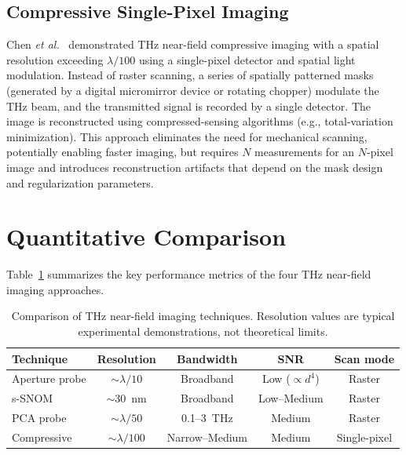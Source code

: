 \documentclass[reprint,superscriptaddress,amsmath,amssymb]{revtex4-2}
\begin{document}
\subsection{Compressive Single-Pixel Imaging}

Chen \textit{et al.}~\cite{Chen2019} demonstrated THz near-field compressive imaging with a spatial resolution exceeding $\lambda/100$ using a single-pixel detector and spatial light modulation. Instead of raster scanning, a series of spatially patterned masks (generated by a digital micromirror device or rotating chopper) modulate the THz beam, and the transmitted signal is recorded by a single detector. The image is reconstructed using compressed-sensing algorithms (e.g., total-variation minimization). This approach eliminates the need for mechanical scanning, potentially enabling faster imaging, but requires $N$ measurements for an $N$-pixel image and introduces reconstruction artifacts that depend on the mask design and regularization parameters.

\section{Quantitative Comparison}
\label{sec:comparison}

Table~\ref{tab:comparison} summarizes the key performance metrics of the four THz near-field imaging approaches.

\begin{table}[htbp]
\caption{Comparison of THz near-field imaging techniques. Resolution values are typical experimental demonstrations, not theoretical limits.}
\label{tab:comparison}
\begin{ruledtabular}
\begin{tabular}{lcccc}
Technique & Resolution & Bandwidth & SNR & Scan mode \\
\hline
Aperture probe & $\sim\!\lambda/10$ & Broadband & Low ($\propto d^4$) & Raster \\
s-SNOM & $\sim$30~nm & Broadband & Low--Medium & Raster \\
PCA probe & $\sim\!\lambda/50$ & 0.1--3~THz & Medium & Raster \\
Compressive & $\sim\!\lambda/100$ & Narrow--Medium & Medium & Single-pixel \\
\end{tabular}
\end{ruledtabular}
\end{table}
\end{document}
